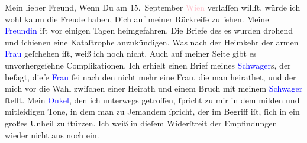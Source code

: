 \pstart\center{}Mein lieber Freund,\pend
\pstart
           Wenn Du am 15. September{ }\textcolor{pink}{Wien}{}\ledrightnote{\textcolor{pink}{Wien}} verlaſſen willſt, würde ich wohl kaum die
               Freude haben, Dich auf meiner Rückreiſe zu ſehen. Meine \textcolor{blue}{Freundin}{}\ledrightnote{{$\rightarrow$}\textcolor{blue}{Theodore Rottenberg}} iſt vor einigen Tagen
               heimgefahren. Die Briefe des \label{K_L03386-1v}\label{K_L03386-1h}es wurden drohend und ſchienen eine
               Kataſtrophe anzukündigen. Was nach der Heimkehr der armen \textcolor{blue}{Frau}{}\ledrightnote{{$\rightarrow$}\textcolor{blue}{Theodore Rottenberg}} geſchehen iſt, weiß ich noch nicht.
               Auch auf meiner Seite gibt es  unvorhergeſehne Complikationen. Ich erhielt einen Brief meines \textcolor{blue}{Schwager}{}\ledrightnote{{$\rightarrow$}\textcolor{blue}{Josef Rosengart}}s, der beſagt, dieſe
                  \textcolor{blue}{Frau}{}\ledrightnote{{$\rightarrow$}\textcolor{blue}{Theodore Rottenberg}} ſei nach den \label{K_L03386-2v}\label{K_L03386-2h} nicht mehr eine Frau, die man
               heirathet, und der mich vor die Wahl zwiſchen einer Heirath und einem Bruch mit
               meinem \textcolor{blue}{Schwager}{}\ledrightnote{{$\rightarrow$}\textcolor{blue}{Josef Rosengart}} ſtellt. Mein
                  \textcolor{blue}{Onkel}{}\ledrightnote{{$\rightarrow$}\textcolor{blue}{Fedor Mamroth}}, den ich unterwegs
               getroffen, ſpricht zu mir in dem milden und mitleidigen Tone, in dem man zu Jemandem ſpricht, der im
               Begriff iſt, ſich in ein großes Unheil zu ſtürzen. Ich weiß in dieſem {\pb}Widerſtreit der Empfindungen wieder nicht aus noch
               ein.\pend
           
